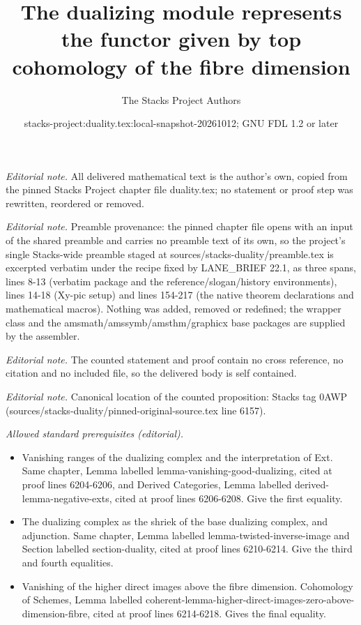 \documentclass[10pt,a4paper]{amsart}
\title{The dualizing module represents the functor given by top cohomology of the fibre dimension}
\author{The Stacks Project Authors}
\date{stacks-project:duality.tex:local-snapshot-20261012; GNU FDL 1.2 or later}
\theoremstyle{plain}
\theoremstyle{definition}
\theoremstyle{remark}
\numberwithin{equation}{subsection}
\begin{document}
\maketitle
\noindent\textit{Editorial note.} All delivered mathematical text is the author's own, copied from the pinned Stacks Project chapter file duality.tex; no statement or proof step was rewritten, reordered or removed.\par\medskip
\noindent\textit{Editorial note.} Preamble provenance: the pinned chapter file opens with an input of the shared preamble and carries no preamble text of its own, so the project's single Stacks-wide preamble staged at sources/stacks-duality/preamble.tex is excerpted verbatim under the recipe fixed by LANE\_BRIEF 22.1, as three spans, lines 8-13 (verbatim package and the reference/slogan/history environments), lines 14-18 (Xy-pic setup) and lines 154-217 (the native theorem declarations and mathematical macros). Nothing was added, removed or redefined; the wrapper class and the amsmath/amssymb/amsthm/graphicx base packages are supplied by the assembler.\par\medskip
\noindent\textit{Editorial note.} The counted statement and proof contain no cross reference, no citation and no included file, so the delivered body is self contained.\par\medskip
\noindent\textit{Editorial note.} Canonical location of the counted proposition: Stacks tag 0AWP (sources/stacks-duality/pinned-original-source.tex line 6157).\par\medskip
\noindent\textit{Allowed standard prerequisites (editorial).}\begin{itemize}
\item Vanishing ranges of the dualizing complex and the interpretation of Ext. Same chapter, Lemma labelled lemma-vanishing-good-dualizing, cited at proof lines 6204-6206, and Derived Categories, Lemma labelled derived-lemma-negative-exts, cited at proof lines 6206-6208. Give the first equality.
\item The dualizing complex as the shriek of the base dualizing complex, and adjunction. Same chapter, Lemma labelled lemma-twisted-inverse-image and Section labelled section-duality, cited at proof lines 6210-6214. Give the third and fourth equalities.
\item Vanishing of the higher direct images above the fibre dimension. Cohomology of Schemes, Lemma labelled coherent-lemma-higher-direct-images-zero-above-dimension-fibre, cited at proof lines 6214-6218. Gives the final equality.
\end{itemize}\medskip
\end{document}

